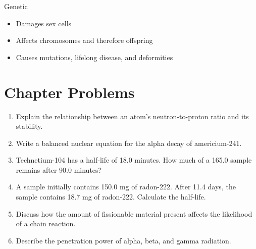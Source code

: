\documentclass[../hchem.tex]{subfiles}
\begin{document}
Genetic 
\begin{itemize}
    \item Damages sex cells 
    \item Affects chromosomes and therefore offspring 
    \item Causes mutations, lifelong disease, and deformities 
\end{itemize}

\section*{Chapter Problems}
\begin{enumerate}
    \item Explain the relationship between an atom's neutron-to-proton ratio and its stability.
    \item Write a balanced nuclear equation for the alpha decay of americium-241.
    \item Technetium-104 has a half-life of 18.0 minutes. How much of a 165.0 sample remains after 90.0 minutes?
    \item A sample initially contains 150.0 mg of radon-222. After 11.4 days, the sample contains 18.7 mg of radon-222. Calculate the half-life.
    \item Discuss how the amount of fissionable material present affects the likelihood of a chain reaction.
    \item Describe the penetration power of alpha, beta, and gamma radiation.
\end{enumerate}
\end{document}
